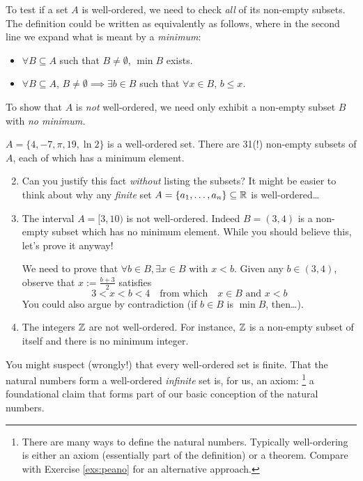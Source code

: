 To test if a set $A$ is well-ordered, we need to check \emph{all} of its non-empty subsets. The definition could be written as equivalently as follows, where in the second line we expand what is meant by a \emph{minimum}:
\begin{itemize}
  \item $\forall B\subseteq A$ such that $B\neq\emptyset$, $\min B$ exists.
  \item $\forall B\subseteq A$, $B\neq\emptyset\implies \exists b\in B$ such that $\forall x\in B$, $b\le x$.
\end{itemize}
To show that $A$ is \emph{not} well-ordered, we need only exhibit a non-empty subset $B$ with \emph{no minimum.}

\begin{examples}{}{}
	\exstart $A=\{4,-7,\pi,19,\ln 2\}$ is a well-ordered set. There are 31(!) non-empty subsets of $A$, each of which has a minimum element.\vspace{-5pt}
	\begin{enumerate}\setcounter{enumi}{1}
	  \item[] Can you justify this fact \emph{without} listing the subsets? It might be easier to think about why any \emph{finite} set $A=\{a_1,\ldots,a_n\}\subseteq\mathbb{R}$ is well-ordered\ldots 
	  
	  \item The interval $A=[3,10)$ is not well-ordered. Indeed $B=(3,4)$ is a non-empty subset which has no minimum element. While you should believe this, let's prove it anyway!\par
	  We need to prove that $\forall b\in B, \exists x\in B$ with $x<b$. Given any $b\in(3,4)$, observe that $x:=\frac{b+3}2$ satisfies
	  \[
	  	3<x<b<4 \quad\text{from which}\quad x\in B\text{ and }x<b
	  \]
	  You could also argue by contradiction (if $b\in B$ is $\min B$, then\ldots).
	  
	  \item The integers $\mathbb{Z}$ are not well-ordered. For instance, $\mathbb{Z}$ is a non-empty subset of itself and there is no minimum integer.
	\end{enumerate}
\end{examples}

You might suspect (wrongly!) that every well-ordered set is finite. That the natural numbers form a well-ordered \emph{infinite} set is, for us, an axiom:
\footnote{There are many ways to define the natural numbers. Typically well-ordering is either an axiom (essentially part of the definition) or a theorem. Compare with Exercise \ref{exs:peano} for an alternative approach.} a foundational claim that forms part of our basic conception of the natural numbers.

